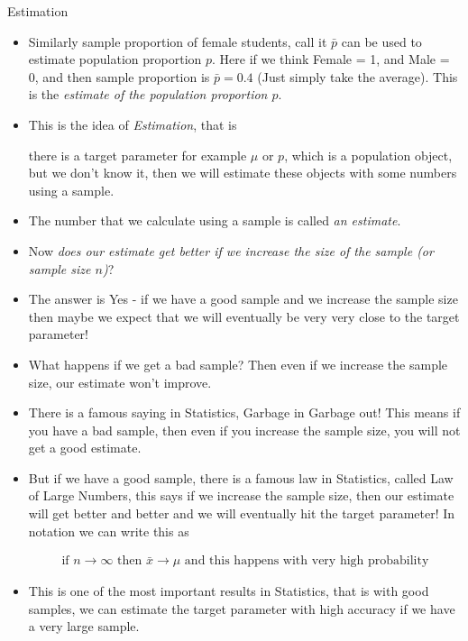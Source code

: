 \documentclass[8pt, usepdftitle=false]{beamer}
\begin{document}
\begin{frame}[allowframebreaks]{Estimation}
\begin{itemize}
  \item Similarly \alert{sample proportion of female students}, call it $\bar{p}$ can be used to estimate population proportion $p$. Here if we think Female = 1, and Male = 0, and then sample proportion is $\bar{p} = 0.4$ (Just simply take the average). This is the \emph{estimate of the population proportion $p$}.


  \item This is the idea of \emph{Estimation}, that is

  \medskip
  \alert{there is a target parameter for example $\mu$ or $p$, which is a population object, but we don't know it, then we will estimate these objects with some numbers using a sample}.
  \medskip

  \item The number that we calculate using a sample is called \emph{an estimate}.

  \item Now \emph{does our estimate get better if we increase the size of the sample (or sample size $n$)}? 

  \item The answer is Yes - if we have a good sample and we increase the sample size then maybe we expect that we will \alert{eventually be very very close to the target parameter!}

  \item What happens if we get a bad sample? Then even if we increase the sample size, our estimate won't improve.

  \item There is a famous saying in Statistics, \alert{Garbage in Garbage out!} This means if you have a bad sample, then even if you increase the sample size, you will not get a good estimate. 


  \framebreak

  \item But if we have a good sample, there is a famous law in Statistics, called \alert{Law of Large Numbers}, this says if we increase the sample size, then our estimate will get better and better and we will eventually hit the target parameter! In notation we can write this as

   \begin{align*}
      \text{if } n \to \infty \text{ then } \bar{x} \to \mu \text{ and this happens with very high probability}
   \end{align*}


   \item This is one of the most important results in Statistics, that is with good samples, we can estimate the target parameter with high accuracy if we have a very large sample. 


\end{itemize}
\end{frame}
\end{document}
